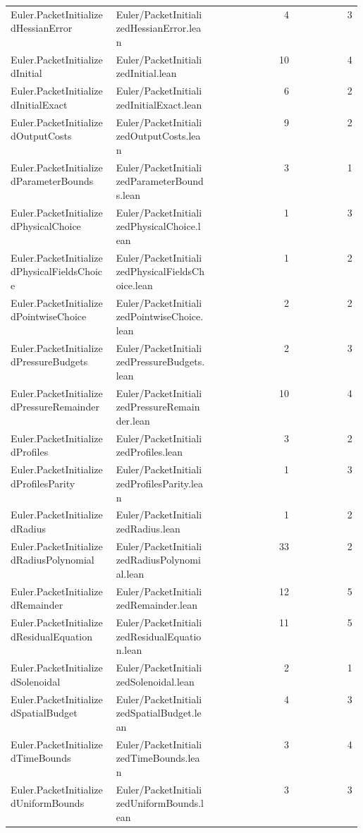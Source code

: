 \begin{longtable}{p{0.30\linewidth}p{0.28\linewidth}rr}
Euler.PacketInitializedHessianError & Euler/PacketInitializedHessianError.lean & 4 & 3\\
Euler.PacketInitializedInitial & Euler/PacketInitializedInitial.lean & 10 & 4\\
Euler.PacketInitializedInitialExact & Euler/PacketInitializedInitialExact.lean & 6 & 2\\
Euler.PacketInitializedOutputCosts & Euler/PacketInitializedOutputCosts.lean & 9 & 2\\
Euler.PacketInitializedParameterBounds & Euler/PacketInitializedParameterBounds.lean & 3 & 1\\
Euler.PacketInitializedPhysicalChoice & Euler/PacketInitializedPhysicalChoice.lean & 1 & 3\\
Euler.PacketInitializedPhysicalFieldsChoice & Euler/PacketInitializedPhysicalFieldsChoice.lean & 1 & 2\\
Euler.PacketInitializedPointwiseChoice & Euler/PacketInitializedPointwiseChoice.lean & 2 & 2\\
Euler.PacketInitializedPressureBudgets & Euler/PacketInitializedPressureBudgets.lean & 2 & 3\\
Euler.PacketInitializedPressureRemainder & Euler/PacketInitializedPressureRemainder.lean & 10 & 4\\
Euler.PacketInitializedProfiles & Euler/PacketInitializedProfiles.lean & 3 & 2\\
Euler.PacketInitializedProfilesParity & Euler/PacketInitializedProfilesParity.lean & 1 & 3\\
Euler.PacketInitializedRadius & Euler/PacketInitializedRadius.lean & 1 & 2\\
Euler.PacketInitializedRadiusPolynomial & Euler/PacketInitializedRadiusPolynomial.lean & 33 & 2\\
Euler.PacketInitializedRemainder & Euler/PacketInitializedRemainder.lean & 12 & 5\\
Euler.PacketInitializedResidualEquation & Euler/PacketInitializedResidualEquation.lean & 11 & 5\\
Euler.PacketInitializedSolenoidal & Euler/PacketInitializedSolenoidal.lean & 2 & 1\\
Euler.PacketInitializedSpatialBudget & Euler/PacketInitializedSpatialBudget.lean & 4 & 3\\
Euler.PacketInitializedTimeBounds & Euler/PacketInitializedTimeBounds.lean & 3 & 4\\
Euler.PacketInitializedUniformBounds & Euler/PacketInitializedUniformBounds.lean & 3 & 3\\

\end{longtable}
